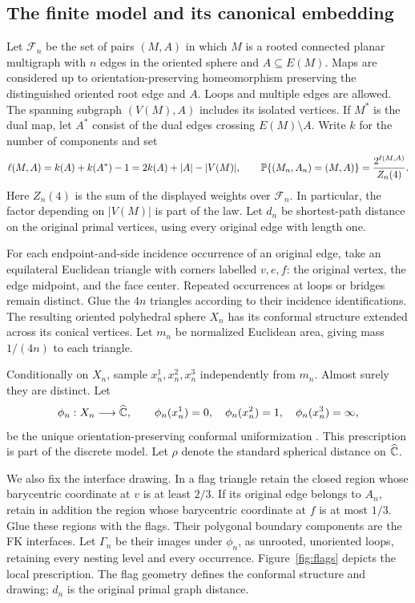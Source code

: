 \subsection{The finite model and its canonical embedding}

Let $\mathcal F_n$ be the set of pairs $(M,A)$ in which $M$ is a rooted connected planar multigraph with $n$ edges in the oriented sphere and $A\subseteq E(M)$. Maps are considered up to orientation-preserving homeomorphism preserving the distinguished oriented root edge and $A$. Loops and multiple edges are allowed. The spanning subgraph $(V(M),A)$ includes its isolated vertices. If $M^*$ is the dual map, let $A^*$ consist of the dual edges crossing $E(M)\setminus A$. Write $k$ for the number of components and set
\begin{equation}\label{intro:fk-weight}
 \ell(M,A)=k(A)+k(A^*)-1
 =2k(A)+|A|-|V(M)|,
 \qquad
 \mathbb P\{(M_n,A_n)=(M,A)\}
 =\frac{2^{\ell(M,A)}}{Z_n(4)}.
\end{equation}
Here $Z_n(4)$ is the sum of the displayed weights over $\mathcal F_n$. In particular, the factor depending on $|V(M)|$ is part of the law. Let $d_n$ be shortest-path distance on the original primal vertices, using every original edge with length one.

For each endpoint-and-side incidence occurrence of an original edge, take an equilateral Euclidean triangle with corners labelled $v,e,f$: the original vertex, the edge midpoint, and the face center. Repeated occurrences at loops or bridges remain distinct. Glue the $4n$ triangles according to their incidence identifications. The resulting oriented polyhedral sphere $X_n$ has its conformal structure extended across its conical vertices. Let $m_n$ be normalized Euclidean area, giving mass $1/(4n)$ to each triangle.

Conditionally on $X_n$, sample $x_n^1,x_n^2,x_n^3$ independently from $m_n$. Almost surely they are distinct. Let
\[
 \phi_n:X_n\longrightarrow\widehat{\mathbb C},
 \qquad \phi_n(x_n^1)=0,\quad
 \phi_n(x_n^2)=1,\quad \phi_n(x_n^3)=\infty,
\]
be the unique orientation-preserving conformal uniformization
\cite[Theorem~II.2.15]{SaintGervaisUniformization}. This prescription is part of the discrete model. Let $\rho$ denote the standard spherical distance on $\widehat{\mathbb C}$.

We also fix the interface drawing. In a flag triangle retain the closed region whose barycentric coordinate at $v$ is at least $2/3$. If its original edge belongs to $A_n$, retain in addition the region whose barycentric coordinate at $f$ is at most $1/3$. Glue these regions with the flags. Their polygonal boundary components are the FK interfaces. Let $\Gamma_n$ be their images under $\phi_n$, as unrooted, unoriented loops, retaining every nesting level and every occurrence. Figure~\ref{fig:flags} depicts the local prescription. The flag geometry defines the conformal structure and drawing; $d_n$ is the original primal graph distance.

